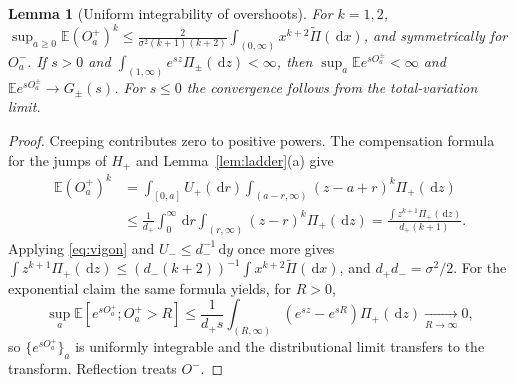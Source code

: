 \documentclass[11pt,a4paper]{article}
\newtheorem{lemma}[theorem]{Lemma}
\theoremstyle{definition}
\theoremstyle{remark}
\newcommand{\E}{\mathbb E}
\newcommand{\1}{\mathbf 1}
\newcommand{\dd}{\,\mathrm d}
\begin{document}
\begin{lemma}[Uniform integrability of overshoots]\label{lem:overshoot}
For $k=1,2$, $\sup_{a\ge0}\E(O_a^+)^k\le\frac{2}{\sigma^2(k+1)(k+2)}\int_{(0,\infty)}x^{k+2}\widetilde\Pi(\dd x)$, and symmetrically for $O_a^-$. If $s>0$ and $\int_{(1,\infty)}e^{sz}\Pi_\pm(\dd z)<\infty$, then $\sup_a\E e^{sO_a^\pm}<\infty$ and $\E e^{sO_a^\pm}\to G_\pm(s)$. For $s\le0$ the convergence follows from the total-variation limit.
\end{lemma}
\begin{proof}
Creeping contributes zero to positive powers. The compensation formula for the jumps of $H_+$ and Lemma~\ref{lem:ladder}(a) give
\begin{align*}
 \E(O_a^+)^k&=\int_{[0,a]}U_+(\dd r)\int_{(a-r,\infty)}(z-a+r)^k\Pi_+(\dd z)\\
 &\le\frac1{d_+}\int_0^\infty\dd r\int_{(r,\infty)}(z-r)^k\Pi_+(\dd z)=\frac{\int z^{k+1}\Pi_+(\dd z)}{d_+(k+1)}.
\end{align*}
Applying \eqref{eq:vigon} and $U_-\le d_-^{-1}\dd y$ once more gives $\int z^{k+1}\Pi_+(\dd z)\le(d_-(k+2))^{-1}\int x^{k+2}\widetilde\Pi(\dd x)$, and $d_+d_-=\sigma^2/2$. For the exponential claim the same formula yields, for $R>0$,
\begin{equation}\label{eq:UI}
 \sup_a\E[e^{sO_a^+};O_a^+>R]\le\frac1{d_+s}\int_{(R,\infty)}(e^{sz}-e^{sR})\Pi_+(\dd z)\xrightarrow[R\to\infty]{}0,
\end{equation}
so $\{e^{sO_a^+}\}_a$ is uniformly integrable and the distributional limit transfers to the transform. Reflection treats $O^-$.
\end{proof}
\end{document}

